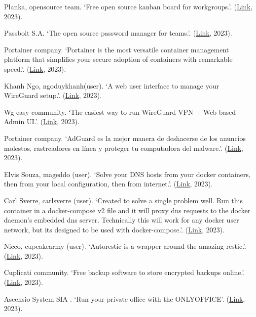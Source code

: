 \documentclass[spanish,final]{setup/eetac_tfc_pfc}
\begin{document}
\begin{thebibliography}{2}
Planka, opensource team.
`Free open source kanban board for workgroups.'.
(\href{https://planka.app/}{Link}, 2023).

Passbolt S.A.
`The open source password manager for teams.'.
(\href{https://www.passbolt.com/}{Link}, 2023).

Portainer company.
`Portainer is the most versatile container management platform that simplifies your secure adoption of containers with remarkable speed.'.
(\href{https://www.portainer.io/contact-us}{Link}, 2023).

Khanh Ngo, ngoduykhanh(user).
`A web user interface to manage your WireGuard setup.'.
(\href{https://github.com/ngoduykhanh/wireguard-ui}{Link}, 2023).

Wg-easy community.
`The easiest way to run WireGuard VPN + Web-based Admin UI.'.
(\href{https://github.com/wg-easy/wg-easy}{Link}, 2023).

Portainer company.
`AdGuard es la mejor manera de deshacerse de los anuncios molestos, rastreadores en línea y proteger tu computadora del malware.'.
(\href{https://adguard.com/es/welcome.html}{Link}, 2023).

Elvis Souza, mageddo (user).
`Solve your DNS hosts from your docker containers, then from your local configuration, then from internet.'.
(\href{https://github.com/mageddo/dns-proxy-server}{Link}, 2023).

Carl Sverre, carlsverre (user).
`Created to solve a single problem well. Run this container in a docker-compose v2 file and it will proxy dns requests to the docker daemon's embedded dns server. Technically this will work for any docker user network, but its designed to be used with docker-compose.'.
(\href{https://github.com/carlsverre/damn-simple-dns-proxy}{Link}, 2023).

Nicco, cupcakearmy (user).
`Autorestic is a wrapper around the amazing restic.'.
(\href{https://autorestic.vercel.app/}{Link}, 2023).

Cuplicati community.
`Free backup software to store encrypted backups online.'.
(\href{https://www.duplicati.com/}{Link}, 2023).

Ascensio System SIA .
`Run your private office with the ONLYOFFICE'.
(\href{https://www.onlyoffice.com/}{Link}, 2023).


\end{thebibliography}
\end{document}
